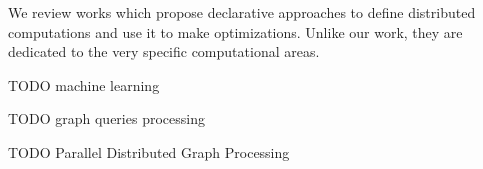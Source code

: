 We review works which propose declarative approaches to define distributed computations and use it to make optimizations.
Unlike our work, they are dedicated to the very specific computational areas.

TODO machine learning

TODO graph queries processing


TODO Parallel Distributed Graph Processing


